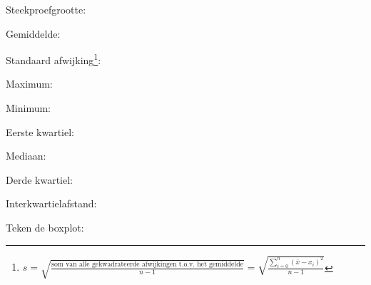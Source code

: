 \documentclass[12pt,twoside,a4paper]{article}
\begin{document}
Steekproefgrootte:\arulefill

Gemiddelde:\arulefill

Standaard afwijking\footnote{$s = \sqrt{\frac{\mbox{som van alle gekwadrateerde afwijkingen t.o.v. het gemiddelde}}{n-1}} = \sqrt{\frac{\sum_{i=0}^n(\bar{x}-x_i)^2}{n-1}}$}:\arulefill

Maximum:\arulefill

Minimum:\arulefill

Eerste kwartiel:\arulefill

Mediaan:\arulefill

Derde kwartiel:\arulefill

Interkwartielafstand:\arulefill

Teken de boxplot:

\ruitjes{3cm}
\end{document}
